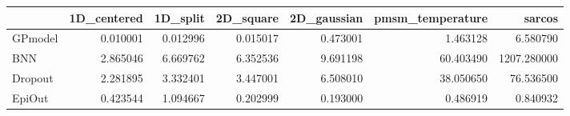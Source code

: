 \begin{tabular}{lrrrrrr}
\toprule
{} &  1D\_centered &  1D\_split &  2D\_square &  2D\_gaussian &  pmsm\_temperature &       sarcos \\
\midrule
GPmodel &     0.010001 &  0.012996 &   0.015017 &     0.473001 &          1.463128 &     6.580790 \\
BNN     &     2.865046 &  6.669762 &   6.352536 &     9.691198 &         60.403490 &  1207.280000 \\
Dropout &     2.281895 &  3.332401 &   3.447001 &     6.508010 &         38.050650 &    76.536500 \\
EpiOut  &     0.423544 &  1.094667 &   0.202999 &     0.193000 &          0.486919 &     0.840932 \\
\bottomrule
\end{tabular}

